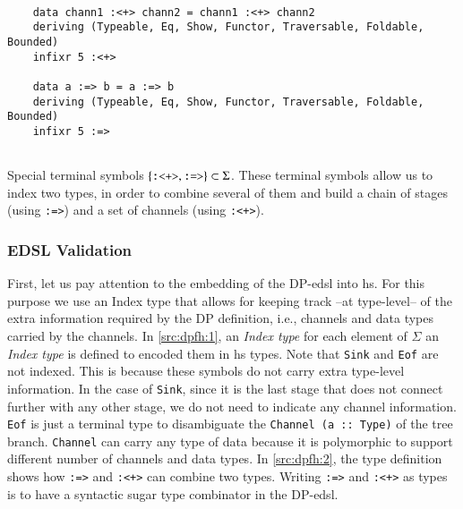 \begin{listing}[H]
  \begin{verbatim}
    
    data chann1 :<+> chann2 = chann1 :<+> chann2
    deriving (Typeable, Eq, Show, Functor, Traversable, Foldable, Bounded)
    infixr 5 :<+>
    
    data a :=> b = a :=> b
    deriving (Typeable, Eq, Show, Functor, Traversable, Foldable, Bounded)
    infixr 5 :=>
    
  \end{verbatim}
  \caption[{[\texttt{Flow.hs}] $\Sigma$ enconding of $G_{dsl}$ - Especial non-terminals}]{Special terminal symbols $\{\text{\texttt{:<+>}}, \text{\texttt{:=>}}\} \subset \Sigma$. These terminal symbols allow us to index two types, in order to combine several of them and build a chain of stages (using \texttt{:=>}) and a set of channels (using \texttt{:<+>}).}
  \label{src:dpfh:2}
\end{listing}

\subsubsection{EDSL Validation}\label{sub:sec:dsl-val}
First, let us pay attention to the embedding of the DP-\acrshort{edsl} into \acrshort{hs}. For this purpose we use an Index type \cite{type-index} that allows for keeping track –at type-level– of the extra information required by the DP definition, i.e., channels and data types carried by the channels. In \autoref{src:dpfh:1}, an \emph{Index type} for each element of $\Sigma$ an \emph{Index type} is defined to encoded them in \acrshort{hs} types. Note that  \texttt{Sink} and  \texttt{Eof} are not indexed. This is because these symbols do not carry extra type-level information. In the case of \texttt{Sink}, since it is the last stage that does not connect further with any other stage, we do not need to indicate any channel information.  \texttt{Eof} is just a terminal type to disambiguate the \texttt{Channel (a :: Type)} of the tree branch. \texttt{Channel} can carry any type of data because it is polymorphic to support different number of channels and data types. 
In \autoref{src:dpfh:2}, the type definition shows how \texttt{:=>} and \texttt{:<+>} can combine two types.  Writing \texttt{:=>} and \texttt{:<+>} as types is to have a syntactic sugar type combinator in the DP-\acrshort{edsl}. 

